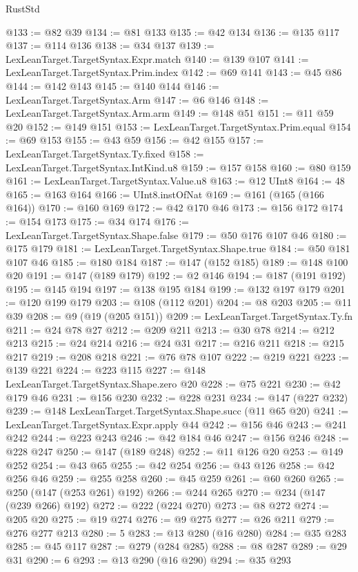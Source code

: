 \begin{lexlean}{RustStd}
\begin{coremodule}
@133 := @82 @39
@134 := @81 @133
@135 := @42 @134
@136 := @135 @117
@137 := @114 @136
@138 := @34 @137
@139 := LexLeanTarget.TargetSyntax.Expr.match
@140 := @139 @107
@141 := LexLeanTarget.TargetSyntax.Prim.index
@142 := @69 @141
@143 := @45 @86
@144 := @142 @143
@145 := @140 @144
@146 := LexLeanTarget.TargetSyntax.Arm
@147 := @6 @146
@148 := LexLeanTarget.TargetSyntax.Arm.arm
@149 := @148 @51
@151 := @11 @59 @20
@152 := @149 @151
@153 := LexLeanTarget.TargetSyntax.Prim.equal
@154 := @69 @153
@155 := @43 @59
@156 := @42 @155
@157 := LexLeanTarget.TargetSyntax.Ty.fixed
@158 := LexLeanTarget.TargetSyntax.IntKind.u8
@159 := @157 @158
@160 := @80 @159
@161 := LexLeanTarget.TargetSyntax.Value.u8
@163 := @12 UInt8
@164 := 48
@165 := @163 @164
@166 := UInt8.instOfNat
@169 := @161 (@165 (@166 @164))
@170 := @160 @169
@172 := @42 @170 @46
@173 := @156 @172
@174 := @154 @173
@175 := @34 @174
@176 := LexLeanTarget.TargetSyntax.Shape.false
@179 := @50 @176 @107 @46
@180 := @175 @179
@181 := LexLeanTarget.TargetSyntax.Shape.true
@184 := @50 @181 @107 @46
@185 := @180 @184
@187 := @147 (@152 @185)
@189 := @148 @100 @20
@191 := @147 (@189 @179)
@192 := @2 @146
@194 := @187 (@191 @192)
@195 := @145 @194
@197 := @138 @195 @184
@199 := @132 @197 @179
@201 := @120 @199 @179
@203 := @108 (@112 @201)
@204 := @8 @203
@205 := @11 @39
@208 := @9 (@19 (@205 @151))
@209 := LexLeanTarget.TargetSyntax.Ty.fn
@211 := @24 @78 @27
@212 := @209 @211
@213 := @30 @78
@214 := @212 @213
@215 := @24 @214
@216 := @24 @31
@217 := @216 @211
@218 := @215 @217
@219 := @208 @218
@221 := @76 @78 @107
@222 := @219 @221
@223 := @139 @221
@224 := @223 @115
@227 := @148 LexLeanTarget.TargetSyntax.Shape.zero @20
@228 := @75 @221
@230 := @42 @179 @46
@231 := @156 @230
@232 := @228 @231
@234 := @147 (@227 @232)
@239 := @148 LexLeanTarget.TargetSyntax.Shape.succ (@11 @65 @20)
@241 := LexLeanTarget.TargetSyntax.Expr.apply @44
@242 := @156 @46
@243 := @241 @242
@244 := @223 @243
@246 := @42 @184 @46
@247 := @156 @246
@248 := @228 @247
@250 := @147 (@189 @248)
@252 := @11 @126 @20
@253 := @149 @252
@254 := @43 @65
@255 := @42 @254
@256 := @43 @126
@258 := @42 @256 @46
@259 := @255 @258
@260 := @45 @259
@261 := @60 @260
@265 := @250 (@147 (@253 @261) @192)
@266 := @244 @265
@270 := @234 (@147 (@239 @266) @192)
@272 := @222 (@224 @270)
@273 := @8 @272
@274 := @205 @20
@275 := @19 @274
@276 := @9 @275
@277 := @26 @211
@279 := @276 @277 @213
@280 := 5
@283 := @13 @280 (@16 @280)
@284 := @35 @283
@285 := @45 @117
@287 := @279 (@284 @285)
@288 := @8 @287
@289 := @29 @31
@290 := 6
@293 := @13 @290 (@16 @290)
@294 := @35 @293

\end{coremodule}
\end{lexlean}
